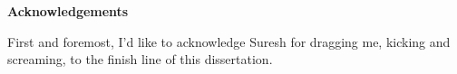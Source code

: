 
\clearpage
\begin{center}
	
	\vspace*{5\baselineskip}
	\textbf{\large Acknowledgements}
\end{center}


\begin{flushleft}
	\hspace{10mm}First and foremost, I'd like to acknowledge Suresh for dragging me, kicking and screaming, to the finish line of this dissertation.
\end{flushleft}
\clearpage



